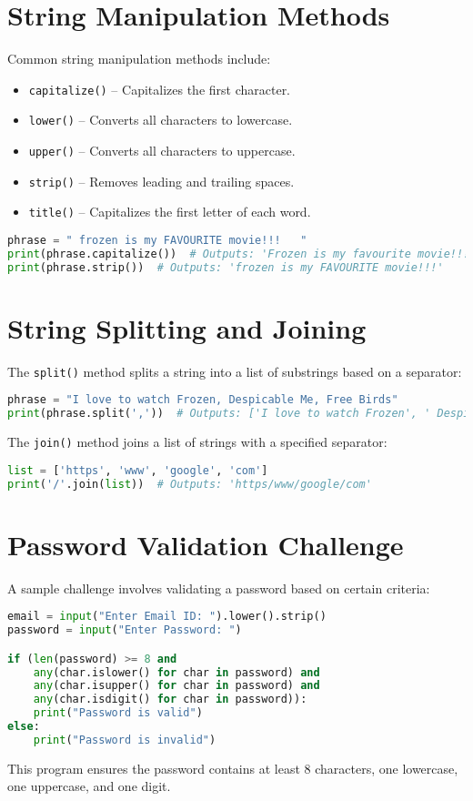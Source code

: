\documentclass{article}
\begin{document}
\section{String Manipulation Methods}
Common string manipulation methods include:
\begin{itemize}
    \item \texttt{capitalize()} – Capitalizes the first character.
    \item \texttt{lower()} – Converts all characters to lowercase.
    \item \texttt{upper()} – Converts all characters to uppercase.
    \item \texttt{strip()} – Removes leading and trailing spaces.
    \item \texttt{title()} – Capitalizes the first letter of each word.
\end{itemize}
\begin{lstlisting}[language=Python]
phrase = " frozen is my FAVOURITE movie!!!   "
print(phrase.capitalize())  # Outputs: 'Frozen is my favourite movie!!!'
print(phrase.strip())  # Outputs: 'frozen is my FAVOURITE movie!!!'
\end{lstlisting}

\section{String Splitting and Joining}
The \texttt{split()} method splits a string into a list of substrings based on a separator:
\begin{lstlisting}[language=Python]
phrase = "I love to watch Frozen, Despicable Me, Free Birds"
print(phrase.split(','))  # Outputs: ['I love to watch Frozen', ' Despicable Me', ' Free Birds ']
\end{lstlisting}

The \texttt{join()} method joins a list of strings with a specified separator:
\begin{lstlisting}[language=Python]
list = ['https', 'www', 'google', 'com']
print('/'.join(list))  # Outputs: 'https/www/google/com'
\end{lstlisting}

\section{Password Validation Challenge}
A sample challenge involves validating a password based on certain criteria:
\begin{lstlisting}[language=Python]
email = input("Enter Email ID: ").lower().strip()
password = input("Enter Password: ")

if (len(password) >= 8 and 
    any(char.islower() for char in password) and
    any(char.isupper() for char in password) and
    any(char.isdigit() for char in password)):
    print("Password is valid")
else:
    print("Password is invalid")
\end{lstlisting}

This program ensures the password contains at least 8 characters, one lowercase, one uppercase, and one digit.
\end{document}
